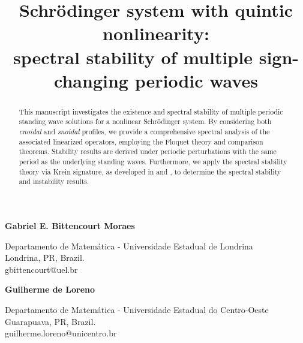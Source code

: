 \documentclass[10pt,reqno,a4paper]{amsart} %
\theoremstyle{definition} %
\numberwithin{equation}{section}
\numberwithin{figure}{section}
\begin{document}
\vglue-1cm \hskip1cm
\title[Multiple periodic waves of the Schrödinger system with quintic nonlinearity]{Schrödinger system with quintic nonlinearity: \\ spectral stability of multiple sign-changing periodic waves
\\ \vspace{0.2cm}}




\begin{center}






\maketitle


{\bf Gabriel E. Bittencourt Moraes}

{Departamento de Matem\'atica - Universidade Estadual de Londrina \\
Londrina, PR, Brazil.}\\
{gbittencourt@uel.br}

\vspace{0.5cm}

{\bf Guilherme de Loreno}

{Departamento de Matem\'atica - Universidade Estadual do Centro-Oeste \\ 
Guarapuava, PR, Brazil.}\\
{guilherme.loreno@unicentro.br}

\vspace{3mm}




\end{center}

\begin{abstract}
This manuscript investigates the existence and spectral stability of multiple periodic standing wave solutions for a nonlinear Schrödinger system. By considering both \textit{cnoidal} and \textit{snoidal} profiles, we provide a comprehensive spectral analysis of the associated linearized operators, employing the Floquet theory and comparison theorems. Stability results are derived under periodic perturbations with the same period as the underlying standing waves. Furthermore, we apply the spectral stability theory via Krein signature, as developed in \cite{KapitulaKevrekidisSandstedeI} and \cite{KapitulaKevrekidisSandstedeII}, to determine the spectral stability and instability results.
\end{abstract}
\end{document}
